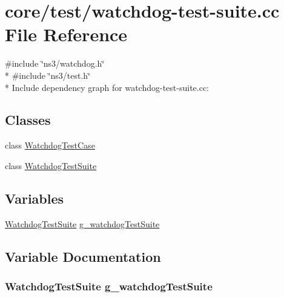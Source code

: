 \hypertarget{watchdog-test-suite_8cc}{}\section{core/test/watchdog-\/test-\/suite.cc File Reference}
\label{watchdog-test-suite_8cc}
{\ttfamily \#include \char`\"{}ns3/watchdog.\+h\char`\"{}}\\*
{\ttfamily \#include \char`\"{}ns3/test.\+h\char`\"{}}\\*
Include dependency graph for watchdog-\/test-\/suite.cc\+:
\subsection*{Classes}
\begin{DoxyCompactItemize}
\item 
class \hyperlink{classWatchdogTestCase}{Watchdog\+Test\+Case}
\item 
class \hyperlink{classWatchdogTestSuite}{Watchdog\+Test\+Suite}
\end{DoxyCompactItemize}
\subsection*{Variables}
\begin{DoxyCompactItemize}
\item 
\hyperlink{classWatchdogTestSuite}{Watchdog\+Test\+Suite} \hyperlink{watchdog-test-suite_8cc_a645669bd27fe2de2e951f2fca3e73cc2}{g\+\_\+watchdog\+Test\+Suite}
\end{DoxyCompactItemize}


\subsection{Variable Documentation}
\subsubsection[{\texorpdfstring{g\+\_\+watchdog\+Test\+Suite}{g_watchdogTestSuite}}]{\setlength{\rightskip}{0pt plus 5cm} {\bf Watchdog\+Test\+Suite}  g\+\_\+watchdog\+Test\+Suite\hspace{0.3cm}{\ttfamily [static]}}\hypertarget{watchdog-test-suite_8cc_a645669bd27fe2de2e951f2fca3e73cc2}{}\label{watchdog-test-suite_8cc_a645669bd27fe2de2e951f2fca3e73cc2}

